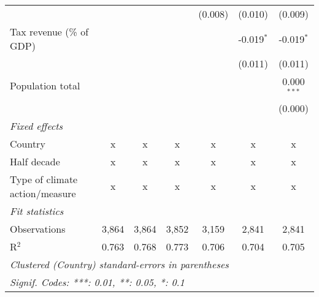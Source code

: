 \begin{tabular}{lcccccc}
                                                        &         &              &               & (0.008)        & (0.010)        & (0.009)\\   
   Tax revenue (\% of GDP)                              &         &              &               &                & -0.019$^{*}$   & -0.019$^{*}$\\   
                                                        &         &              &               &                & (0.011)        & (0.011)\\   
   Population total                                     &         &              &               &                &                & 0.000$^{***}$\\   
                                                        &         &              &               &                &                & (0.000)\\   
   \emph{Fixed effects}\\
   Country                                              & x       & x            & x             & x              & x              & x\\  
   Half decade                                          & x       & x            & x             & x              & x              & x\\  
   Type of climate action/measure                       & x       & x            & x             & x              & x              & x\\  
   \midrule \emph{Fit statistics}\\
   Observations                                         & 3,864   & 3,864        & 3,852         & 3,159          & 2,841          & 2,841\\  
   R$^2$                                                & 0.763   & 0.768        & 0.773         & 0.706          & 0.704          & 0.705\\  
   \midrule
   \multicolumn{7}{l}{\emph{Clustered (Country) standard-errors in parentheses}}\\
   \multicolumn{7}{l}{\emph{Signif. Codes: ***: 0.01, **: 0.05, *: 0.1}}\\
\end{tabular}
\par\endgroup


